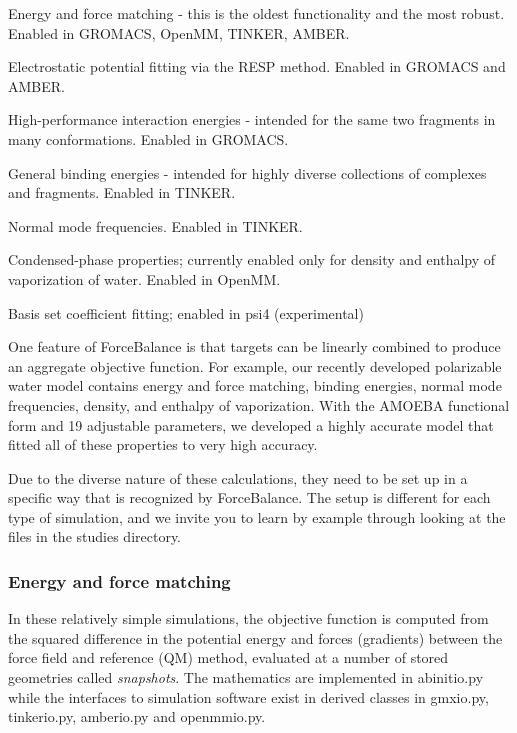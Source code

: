 \begin{DoxyItemize}
\item \-Energy and force matching -\/ this is the oldest functionality and the most robust. \-Enabled in \-G\-R\-O\-M\-A\-C\-S, \-Open\-M\-M, \-T\-I\-N\-K\-E\-R, \-A\-M\-B\-E\-R. \item \-Electrostatic potential fitting via the \-R\-E\-S\-P method. \-Enabled in \-G\-R\-O\-M\-A\-C\-S and \-A\-M\-B\-E\-R. \item \-High-\/performance interaction energies -\/ intended for the same two fragments in many conformations. \-Enabled in \-G\-R\-O\-M\-A\-C\-S. \item \-General binding energies -\/ intended for highly diverse collections of complexes and fragments. \-Enabled in \-T\-I\-N\-K\-E\-R. \item \-Normal mode frequencies. \-Enabled in \-T\-I\-N\-K\-E\-R. \item \-Condensed-\/phase properties; currently enabled only for density and enthalpy of vaporization of water. \-Enabled in \-Open\-M\-M. \item \-Basis set coefficient fitting; enabled in psi4 (experimental)\end{DoxyItemize}
\-One feature of \-Force\-Balance is that targets can be linearly combined to produce an aggregate objective function. \-For example, our recently developed polarizable water model contains energy and force matching, binding energies, normal mode frequencies, density, and enthalpy of vaporization. \-With the \-A\-M\-O\-E\-B\-A functional form and 19 adjustable parameters, we developed a highly accurate model that fitted all of these properties to very high accuracy.

\-Due to the diverse nature of these calculations, they need to be set up in a specific way that is recognized by \-Force\-Balance. \-The setup is different for each type of simulation, and we invite you to learn by example through looking at the files in the {\ttfamily studies} directory.\hypertarget{usage_energy_force_matching}{}\subsubsection{\-Energy and force matching}\label{usage_energy_force_matching}
\-In these relatively simple simulations, the objective function is computed from the squared difference in the potential energy and forces (gradients) between the force field and reference (\-Q\-M) method, evaluated at a number of stored geometries called {\itshape snapshots\/}. \-The mathematics are implemented in {\ttfamily abinitio.\-py} while the interfaces to simulation software exist in derived classes in {\ttfamily gmxio.\-py}, {\ttfamily tinkerio.\-py}, {\ttfamily amberio.\-py} and {\ttfamily openmmio.\-py}.

